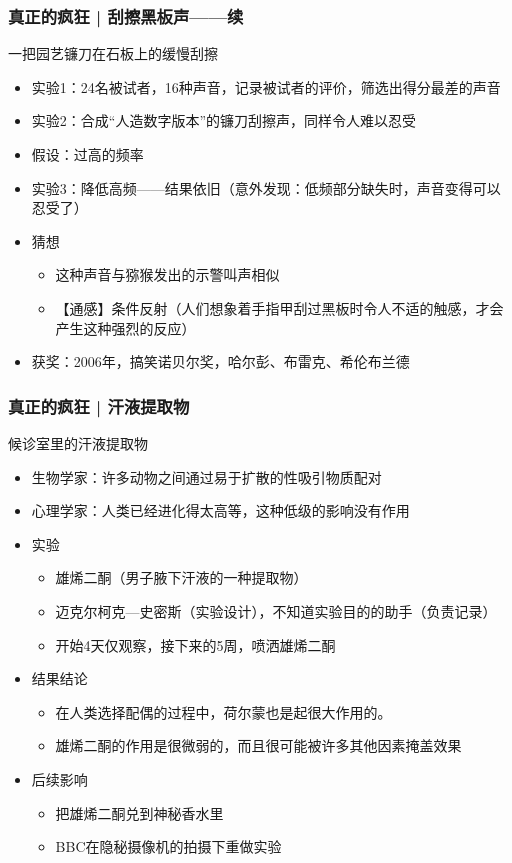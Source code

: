 \begin{frame}
  \frametitle{真正的疯狂 | 刮擦黑板声——续}
  \begin{block}{一把园艺镰刀在石板上的缓慢刮擦}
    \begin{itemize}
      \item 实验1：24名被试者，16种声音，记录被试者的评价，筛选出得分最差的声音
      \item 实验2：合成“人造数字版本”的镰刀刮擦声，同样令人难以忍受
      \item 假设：过高的频率
      \item 实验3：降低高频——结果依旧（意外发现：低频部分缺失时，声音变得可以忍受了）
      \item 猜想
        \begin{itemize}
          \item 这种声音与猕猴发出的示警叫声相似
          \item 【通感】条件反射（人们想象着手指甲刮过黑板时令人不适的触感，才会产生这种强烈的反应）
        \end{itemize}
      \item 获奖：2006年，搞笑诺贝尔奖，哈尔彭、布雷克、希伦布兰德
    \end{itemize}
  \end{block}
\end{frame}

\begin{frame}
  \frametitle{真正的疯狂 | 汗液提取物}
  \begin{block}{候诊室里的汗液提取物}
    \begin{itemize}
      \item 生物学家：许多动物之间通过易于扩散的性吸引物质配对
      \item 心理学家：人类已经进化得太高等，这种低级的影响没有作用
    \pause
      \item 实验
        \begin{itemize}
          \item 雄烯二酮（男子腋下汗液的一种提取物）
          \item 迈克尔\textbullet 柯克—史密斯（实验设计），不知道实验目的的助手（负责记录）
          \item 开始4天仅观察，接下来的5周，喷洒雄烯二酮
        \end{itemize}
      \item 结果结论
        \begin{itemize}
          \item 在人类选择配偶的过程中，荷尔蒙也是起很大作用的。
          \item 雄烯二酮的作用是很微弱的，而且很可能被许多其他因素掩盖效果
        \end{itemize}
      \item 后续影响
        \begin{itemize}
          \item 把雄烯二酮兑到神秘香水里
          \item BBC在隐秘摄像机的拍摄下重做实验
        \end{itemize}
    \end{itemize}
  \end{block}
\end{frame}

